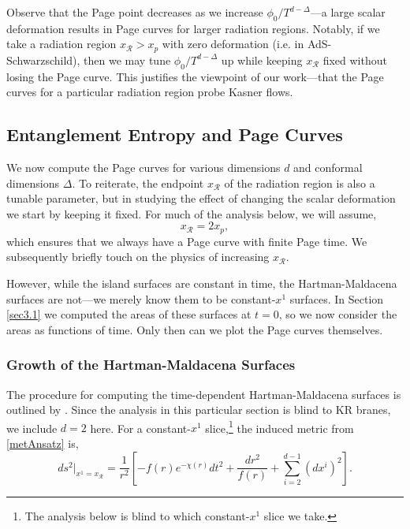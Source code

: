 \documentclass[12pt,a4paper]{article}
\begin{document}
Observe that the Page point decreases as we increase $\phi_0/T^{d-\Delta}$---a large scalar deformation results in Page curves for larger radiation regions. Notably, if we take a radiation region $x_\mathcal{R}> x_p$ with zero deformation (i.e. in AdS-Schwarzschild), then we may tune $\phi_0/T^{d-\Delta}$ up while keeping $x_\mathcal{R}$ fixed without losing the Page curve. This justifies the viewpoint of our work---that the Page curves for a particular radiation region probe Kasner flows.

\subsection{Entanglement Entropy and Page Curves}\label{sec3.2}

We now compute the Page curves for various dimensions $d$ and conformal dimensions $\Delta$. To reiterate, the endpoint $x_{\mathcal{R}}$ of the radiation region is also a tunable parameter, but in studying the effect of changing the scalar deformation we start by keeping it fixed. For much of the analysis below, we will assume,
\begin{equation}
x_{\mathcal{R}} = 2x_p,\label{radRegionFix}
\end{equation}
which ensures that we always have a Page curve with finite Page time. We subsequently briefly touch on the physics of increasing $x_\mathcal{R}$.

However, while the island surfaces are constant in time, the Hartman-Maldacena surfaces are not---we merely know them to be constant-$x^1$ surfaces. In Section \ref{sec3.1} we computed the areas of these surfaces at $t = 0$, so we now consider the areas as functions of time. Only then can we plot the Page curves themselves.


\subsubsection{Growth of the Hartman-Maldacena Surfaces}\label{sec3.2.1}

The procedure for computing the time-dependent Hartman-Maldacena surfaces is outlined by \cite{Hartman:2013qma}. Since the analysis in this particular section is blind to KR branes, we include $d = 2$ here. For a constant-$x^1$ slice,\footnote{The analysis below is blind to which constant-$x^1$ slice we take.} the induced metric from \eqref{metAnsatz} is,
\begin{equation}
ds^2|_{x^1 = x_{\mathcal{R}}} = \frac{1}{r^2}\left[-f(r)e^{-\chi(r)} dt^2 + \frac{dr^2}{f(r)} + \sum_{i=2}^{d-1} (dx^i)^2\right].
\end{equation}
\end{document}
